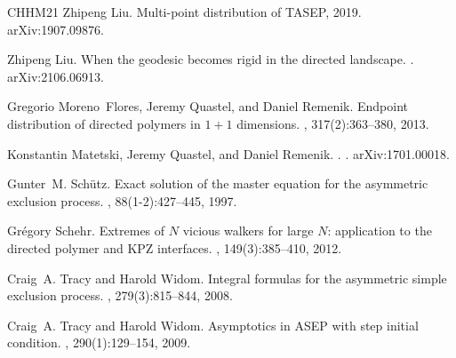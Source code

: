 \documentclass{article}
\numberwithin{equation}{section}
\begin{document}
\begin{thebibliography}{CHHM21}
	Zhipeng Liu.
	\newblock Multi-point distribution of {TASEP}, 2019.
	\newblock arXiv:1907.09876.
	
	Zhipeng Liu.
	\newblock When the geodesic becomes rigid in the directed landscape.
	.
	\newblock arXiv:2106.06913.
	
	Gregorio Moreno~Flores, Jeremy Quastel, and Daniel Remenik.
	\newblock Endpoint distribution of directed polymers in {$1+1$} dimensions.
	, 317(2):363--380, 2013.
	
	Konstantin Matetski, Jeremy Quastel, and Daniel Remenik.
	.
	.
	\newblock arXiv:1701.00018.
	
	Gunter~M. Sch{\"u}tz.
	\newblock Exact solution of the master equation for the asymmetric exclusion
	process.
	, 88(1-2):427--445, 1997.
	
	Gr\'{e}gory Schehr.
	\newblock Extremes of {$N$} vicious walkers for large {$N$}: application to the
	directed polymer and {KPZ} interfaces.
	, 149(3):385--410, 2012.
	
	Craig~A. Tracy and Harold Widom.
	\newblock Integral formulas for the asymmetric simple exclusion process.
	, 279(3):815--844, 2008.
	
	Craig~A. Tracy and Harold Widom.
	\newblock Asymptotics in {ASEP} with step initial condition.
	, 290(1):129--154, 2009.
	
\end{thebibliography}
\end{document}
